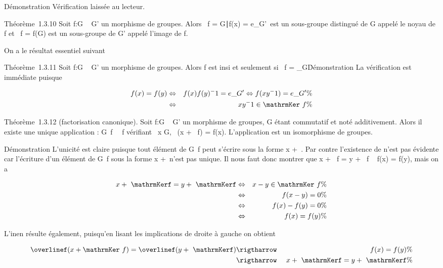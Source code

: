 \documentclass[]{article}
\begin{document}
Démonstration Vérification laissée au lecteur.

Théorème~1.3.10 Soit f:G \rightarrow~ G' un morphisme de groupes. Alors
\mathrmKer~f =
\x \in G∣f(x) =
e\_G'\ est un sous-groupe distingué de G appelé
le noyau de f et \mathrmIm~f
= f(G) est un sous-groupe de G' appelé l'image de f.

On a le résultat essentiel suivant

Théorème~1.3.11 Soit f:G \rightarrow~ G' un morphisme de groupes. Alors f est
in\jmathectif si et seulement si
\mathrmKer~f =
\e\_G\.

Démonstration La vérification est immédiate puisque

\begin{align*} f(x) = f(y)&
\Leftrightarrow & f(x)f(y)^-1 = e\_ G'
\Leftrightarrow f(xy^-1) = e\_ G'\%&
\\ & \Leftrightarrow &
xy^-1
\in\mathrmKer~f \%&
\\ \end{align*}

Théorème~1.3.12 (factorisation canonique). Soit f:G \rightarrow~ G' un morphisme de
groupes, G étant commutatif et noté additivement. Alors il existe une
unique application \overlinef :
G\diagup\mathrmKer~f
\rightarrow~\mathrmIm~f vérifiant
\forall~x \in G, \overlinef~(x
+ \mathrmKer~f) = f(x).
L'application \overlinef est un isomorphisme de
groupes.

Démonstration L'unicité est claire puisque tout élément de
G\diagup\mathrmKer~f peut s'écrire
sous la forme x +\
\mathrmKerf. Par contre l'existence de
\overlinef n'est pas évidente car l'écriture d'un
élément de G\diagup\mathrmKer~f
sous la forme x +\
\mathrmKerf n'est pas unique. Il nous faut donc
montrer que x + \mathrmKer~f
= y + \mathrmKer~f \rigtharrow~ f(x) =
f(y), mais on a

\begin{align*} x +\
\mathrmKerf = y +\
\mathrmKerf& \Leftrightarrow & x - y
\in\mathrmKer~f \%&
\\ & \Leftrightarrow & f(x
- y) = 0 \%& \\ &
\Leftrightarrow & f(x) - f(y) = 0\%&
\\ & \Leftrightarrow & f(x)
= f(y) \%& \\
\end{align*}

L'in en résulte également, puisqu'en lisant les implications de
droite à gauche on obtient

\begin{align*} \overlinef(x
+ \mathrmKer~f) =
\overlinef(y +\
\mathrmKerf)& \rigtharrow~& f(x) = f(y) \%&
\\ & \rigtharrow~& x +\
\mathrmKerf = y +\
\mathrmKerf\%& \\
\end{align*}
\end{document}
